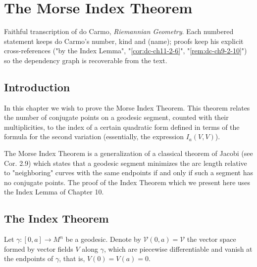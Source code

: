 \chapter{The Morse Index Theorem}
\label{chap:dc-morse-index-theorem}

Faithful transcription of do Carmo, \emph{Riemannian Geometry}. Each numbered
statement keeps do Carmo's number, kind and (name); proofs keep his explicit
cross-references ("by the Index Lemma", "\cref{cor:dc-ch11-2-6}", "\cref{rem:dc-ch9-2-10}") so the dependency graph is recoverable from the text.

\section{Introduction}

In this chapter we wish to prove the Morse Index Theorem. This theorem relates
the number of conjugate points on a geodesic segment, counted with their
multiplicities, to the index of a certain quadratic form defined in terms of the
formula for the second variation (essentially, the expression $I_a(V,V)$).

The Morse Index Theorem is a generalization of a classical theorem of Jacobi
(see Cor. 2.9) which states that a geodesic segment minimizes the arc length
relative to "neighboring" curves with the same endpoints if and only if such a
segment has no conjugate points. The proof of the Index Theorem which we present
here uses the Index Lemma of Chapter 10.

\section{The Index Theorem}

Let $\gamma:[0,a]\to M^n$ be a geodesic. Denote by $\mathcal{V}(0,a)=\mathcal{V}$
the vector space formed by vector fields $V$ along $\gamma$, which are piecewise
differentiable and vanish at the endpoints of $\gamma$, that is,
$V(0)=V(a)=0$.


